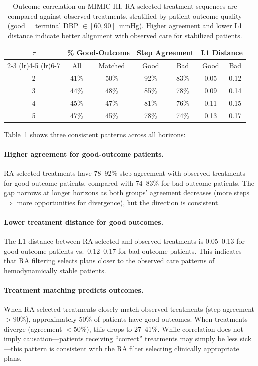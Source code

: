 \documentclass{article}
\begin{document}
\begin{table}[h]
\centering
\caption{Outcome correlation on MIMIC-III. RA-selected treatment sequences are compared against observed treatments, stratified by patient outcome quality (good = terminal DBP $\in [60,90]$~mmHg). Higher agreement and lower L1 distance indicate better alignment with observed care for stabilized patients.}
\label{tab:outcome_correlation}
\small
\begin{tabular}{c cc cc cc}
\toprule
\multirow{2}{*}{$\tau$} & \multicolumn{2}{c}{\% Good-Outcome} & \multicolumn{2}{c}{Step Agreement} & \multicolumn{2}{c}{L1 Distance} \\
\cmidrule(lr){2-3} \cmidrule(lr){4-5} \cmidrule(lr){6-7}
& All & Matched & Good & Bad & Good & Bad \\
\midrule
2 & 41\% & 50\% & 92\% & 83\% & 0.05 & 0.12 \\
3 & 44\% & 48\% & 85\% & 78\% & 0.09 & 0.14 \\
4 & 45\% & 47\% & 81\% & 76\% & 0.11 & 0.15 \\
5 & 47\% & 45\% & 78\% & 74\% & 0.13 & 0.17 \\
\bottomrule
\end{tabular}
\end{table}

Table~\ref{tab:outcome_correlation} shows three consistent patterns across all horizons:

\paragraph{Higher agreement for good-outcome patients.} RA-selected treatments have 78--92\% step agreement with observed treatments for good-outcome patients, compared with 74--83\% for bad-outcome patients. The gap narrows at longer horizons as both groups' agreement decreases (more steps $\Rightarrow$ more opportunities for divergence), but the direction is consistent.

\paragraph{Lower treatment distance for good outcomes.} The L1 distance between RA-selected and observed treatments is 0.05--0.13 for good-outcome patients vs.\ 0.12--0.17 for bad-outcome patients. This indicates that RA filtering selects plans closer to the observed care patterns of hemodynamically stable patients.

\paragraph{Treatment matching predicts outcomes.} When RA-selected treatments closely match observed treatments (step agreement $> 90\%$), approximately 50\% of patients have good outcomes. When treatments diverge (agreement $< 50\%$), this drops to 27--41\%. While correlation does not imply causation---patients receiving ``correct'' treatments may simply be less sick---this pattern is consistent with the RA filter selecting clinically appropriate plans.
\end{document}

